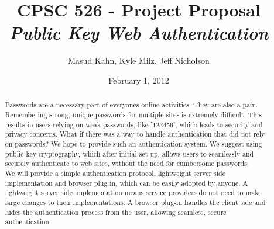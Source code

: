 \documentclass[11pt]{article}   %
\begin{document}
\title{\bf CPSC 526 - Project Proposal \\ \emph{Public Key Web Authentication}}   %
\author{Masud Kahn, Kyle Milz, Jeff Nicholson}         %
\date{February 1, 2012}    %
\maketitle

\tableofcontents
\pagebreak
\begin{abstract}
Passwords are a necessary part of everyones online activities. They are also a pain. Remembering strong, unique passwords for multiple sites is extremely difficult. This results in users relying on weak passwords, like '123456', which leads to security and privacy concerns. What if there was a way to handle authentication that did not rely on passwords? We hope to provide such an authentication system. We suggest using public key cryptography, which after initial set up, allows users to seamlessly and securely authenticate to web sites, without the need for cumbersome passwords.\\
We will provide a simple authentication protocol, lightweight server side implementation and browser plug in, which can be easily adopted by anyone. A lightweight server side implementation means service providers do not need to make large changes to their implementations. A browser plug-in handles the client side and hides the authentication process from the user, allowing seamless, secure authentication.
\end{abstract}
\pagebreak
\end{document}
